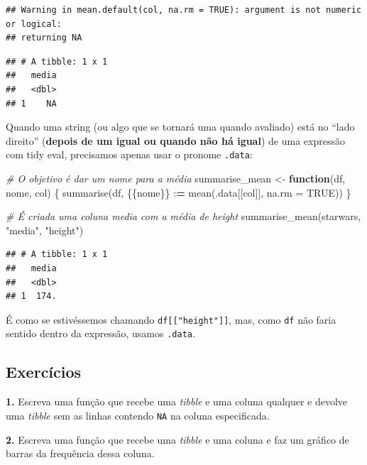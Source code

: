\documentclass[
]{book}
\newenvironment{Shaded}{\begin{snugshade}}{\end{snugshade}}
\newcommand{\AttributeTok}[1]{\textcolor[rgb]{0.77,0.63,0.00}{#1}}
\newcommand{\CommentTok}[1]{\textcolor[rgb]{0.56,0.35,0.01}{\textit{#1}}}
\newcommand{\ConstantTok}[1]{\textcolor[rgb]{0.00,0.00,0.00}{#1}}
\newcommand{\ControlFlowTok}[1]{\textcolor[rgb]{0.13,0.29,0.53}{\textbf{#1}}}
\newcommand{\ErrorTok}[1]{\textcolor[rgb]{0.64,0.00,0.00}{\textbf{#1}}}
\newcommand{\FunctionTok}[1]{\textcolor[rgb]{0.00,0.00,0.00}{#1}}
\newcommand{\NormalTok}[1]{#1}
\newcommand{\OtherTok}[1]{\textcolor[rgb]{0.56,0.35,0.01}{#1}}
\newcommand{\SpecialCharTok}[1]{\textcolor[rgb]{0.00,0.00,0.00}{#1}}
\newcommand{\StringTok}[1]{\textcolor[rgb]{0.31,0.60,0.02}{#1}}
\begin{document}
\begin{verbatim}
## Warning in mean.default(col, na.rm = TRUE): argument is not numeric or logical:
## returning NA
\end{verbatim}

\begin{verbatim}
## # A tibble: 1 x 1
##   media
##   <dbl>
## 1    NA
\end{verbatim}

Quando uma string (ou algo que se tornará uma quando avaliado) está no ``lado direito'' (\textbf{depois de um igual ou quando não há igual}) de uma expressão com tidy eval, precisamos apenas usar o pronome \texttt{.data}:

\begin{Shaded}
\begin{Highlighting}[]
\CommentTok{\# O objetivo é dar um nome para a média}
\NormalTok{summarise\_mean }\OtherTok{\textless{}{-}} \ControlFlowTok{function}\NormalTok{(df, nome, col) \{}
  \FunctionTok{summarise}\NormalTok{(df, \{\{nome\}\} }\SpecialCharTok{:}\ErrorTok{=} \FunctionTok{mean}\NormalTok{(.data[[col]], }\AttributeTok{na.rm =} \ConstantTok{TRUE}\NormalTok{))}
\NormalTok{\}}

\CommentTok{\# É criada uma coluna \textquotesingle{}media\textquotesingle{} com a média de \textquotesingle{}height\textquotesingle{}}
\FunctionTok{summarise\_mean}\NormalTok{(starwars, }\StringTok{"media"}\NormalTok{, }\StringTok{"height"}\NormalTok{)}
\end{Highlighting}
\end{Shaded}

\begin{verbatim}
## # A tibble: 1 x 1
##   media
##   <dbl>
## 1  174.
\end{verbatim}

É como se estivéssemos chamando \texttt{df{[}{[}"height"{]}{]}}, mas, como \texttt{df} não faria sentido dentro da expressão, usamos \texttt{.data}.

\hypertarget{exercuxedcios-24}{%
\subsection{Exercícios}\label{exercuxedcios-24}}

\textbf{1.} Escreva uma função que recebe uma \emph{tibble} e uma coluna qualquer
e devolve uma \emph{tibble} sem as linhas contendo \texttt{NA} na coluna especificada.

\textbf{2.} Escreva uma função que recebe uma \emph{tibble} e uma coluna e faz um gráfico de barras da frequência dessa coluna.
\end{document}
